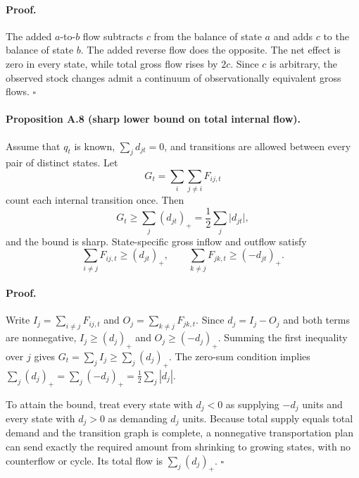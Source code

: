 \paragraph{Proof.}
The added \(a\)-to-\(b\) flow subtracts \(c\) from the balance of state \(a\)
and adds \(c\) to the balance of state \(b\). The added reverse flow does the
opposite. The net effect is zero in every state, while total gross flow rises
by \(2c\). Since \(c\) is arbitrary, the observed stock changes admit a
continuum of observationally equivalent gross flows.
\(\square\)

\paragraph{Proposition A.8 (sharp lower bound on total internal flow).}
Assume that \(q_t\) is known, \(\sum_jd_{jt}=0\), and transitions are allowed
between every pair of distinct states. Let
\begin{equation}
  G_t=\sum_i\sum_{j\neq i}F_{ij,t}
  \label{eq:total-gross-flow}
\end{equation}
count each internal transition once. Then
\begin{equation}
  G_t\geq
  \sum_j(d_{jt})_+
  =\frac12\sum_j\lvert d_{jt}\rvert,
  \label{eq:gross-flow-lower-bound}
\end{equation}
and the bound is sharp. State-specific gross inflow and outflow satisfy
\begin{equation}
  \sum_{i\neq j}F_{ij,t}\geq(d_{jt})_+,
  \qquad
  \sum_{k\neq j}F_{jk,t}\geq(-d_{jt})_+.
  \label{eq:state-flow-lower-bounds}
\end{equation}

\paragraph{Proof.}
Write \(I_j=\sum_{i\neq j}F_{ij,t}\) and
\(O_j=\sum_{k\neq j}F_{jk,t}\). Since \(d_j=I_j-O_j\) and both terms are
nonnegative, \(I_j\geq(d_j)_+\) and \(O_j\geq(-d_j)_+\). Summing the first
inequality over \(j\) gives \(G_t=\sum_jI_j\geq\sum_j(d_j)_+\). The zero-sum
condition implies
\(\sum_j(d_j)_+=\sum_j(-d_j)_+=\frac12\sum_j|d_j|\).

To attain the bound, treat every state with \(d_j<0\) as supplying \(-d_j\)
units and every state with \(d_j>0\) as demanding \(d_j\) units. Because total
supply equals total demand and the transition graph is complete, a
nonnegative transportation plan can send exactly the required amount from
shrinking to growing states, with no counterflow or cycle. Its total flow is
\(\sum_j(d_j)_+\).
\(\square\)

